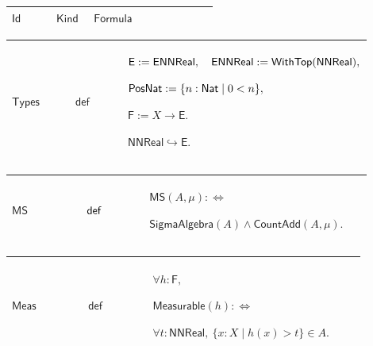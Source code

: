 \documentclass[12pt,reqno]{amsart}
\theoremstyle{blueplain}
\numberwithin{equation}{section}
\begin{document}
{\scriptsize \setlength{\parskip}{0pt}\nointerlineskip
\noindent 
\begin{tabular}{|@{}>{\centering\arraybackslash}m{0.19251\linewidth}|>{\centering\arraybackslash}m{0.16845\linewidth}|>{\centering\arraybackslash}m{0.53904\linewidth}|}
\hline
$\displaystyle \mathsf{Id}$ & $\displaystyle \mathsf{Kind}$ & $\displaystyle 
\mathsf{Formula}$ \\ \hline
\end{tabular}%
}

{\scriptsize \setlength{\parskip}{0pt}\nointerlineskip
\noindent 
\begin{tabular}{|@{}>{\centering\arraybackslash}m{0.19251\linewidth}|>{\centering\arraybackslash}m{0.16845\linewidth}|>{\centering\arraybackslash}m{0.53904\linewidth}|}
\hline
\hypertarget{def:Types}{$\displaystyle \mathsf{Types}$} & $\displaystyle 
\mathsf{def}$ & $\displaystyle \mathsf{E}:=\mathsf{ENNReal},\quad\mathsf{%
ENNReal}:=\mathsf{WithTop}(\mathsf{NNReal}),$\par$\displaystyle \mathsf{%
PosNat}:=\{n:\mathsf{Nat}\mid 0<n\},$\par$\displaystyle \mathsf{F}:=X\to%
\mathsf{E}.$\par$\displaystyle \mathsf{NNReal}\hookrightarrow\mathsf{E}.$ \\ 
\hline
\end{tabular}%
}

{\scriptsize \setlength{\parskip}{0pt}\nointerlineskip
\noindent 
\begin{tabular}{|@{}>{\centering\arraybackslash}m{0.19251\linewidth}|>{\centering\arraybackslash}m{0.16845\linewidth}|>{\centering\arraybackslash}m{0.53904\linewidth}|}
\hline
\hypertarget{def:MS}{$\displaystyle \mathsf{MS}$} & $\displaystyle \mathsf{%
def}$ & $\displaystyle \mathsf{MS}(A,\mu):\Longleftrightarrow$\par$%
\displaystyle \mathsf{SigmaAlgebra}(A)\land\mathsf{CountAdd}(A,\mu).$ \\ 
\hline
\end{tabular}%
}

{\scriptsize \setlength{\parskip}{0pt}\nointerlineskip
\noindent 
\begin{tabular}{|@{}>{\centering\arraybackslash}m{0.19251\linewidth}|>{\centering\arraybackslash}m{0.16845\linewidth}|>{\centering\arraybackslash}m{0.53904\linewidth}|}
\hline
\hypertarget{def:Meas}{$\displaystyle \mathsf{Meas}$} & $\displaystyle 
\mathsf{def}$ & $\displaystyle \forall h:\mathsf{F},$\par$\displaystyle 
\mathsf{Measurable}(h):\Longleftrightarrow$\par$\displaystyle \forall t:%
\mathsf{NNReal},\ \{x:X\mid h(x)>t\}\in A.$ \\ \hline
\end{tabular}%
}
\end{document}

